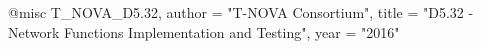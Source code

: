 @misc{ T_NOVA_D5.32,
       author = "{T-NOVA Consortium}",
       title = "D5.32 - Network Functions Implementation and Testing",
       year = "2016" }
